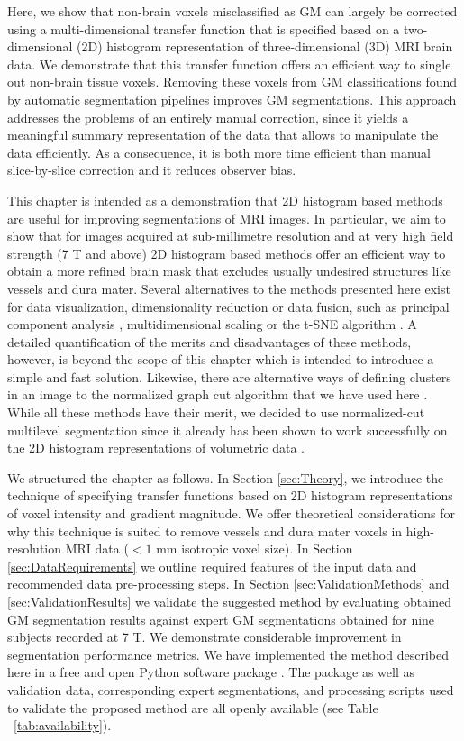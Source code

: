 Here, we show that non-brain voxels misclassified as GM can largely be corrected using a multi-dimensional transfer function that is specified based on a two-dimensional (2D) histogram representation \parencite{Kindlmann1998, Kniss2001, Kniss2005, Ip2012} of three-dimensional (3D) MRI brain data. We demonstrate that this transfer function offers an efficient way to single out non-brain tissue voxels. Removing these voxels from GM classifications found by automatic segmentation pipelines improves GM segmentations. This approach addresses the problems of an entirely manual correction, since it yields a meaningful summary representation of the data that allows to manipulate the data efficiently. As a consequence, it is both more time efficient than manual slice-by-slice correction and it reduces observer bias.

This chapter is intended as a demonstration that 2D histogram based methods are useful for improving segmentations of MRI images. In particular, we aim to show that for images acquired at sub-millimetre resolution and at very high field strength (7 T and above) 2D histogram based methods offer an efficient way to obtain a more refined brain mask that excludes usually undesired structures like vessels and dura mater. Several alternatives to the methods presented here exist for data visualization, dimensionality reduction or data fusion, such as principal component analysis \parencite{PCA2002}, multidimensional scaling \parencite{MDS2005} or the t-SNE algorithm \parencite{VanDerMaaten2008}. A detailed quantification of the merits and disadvantages of these methods, however, is beyond the scope of this chapter which is intended to introduce a simple and fast solution. Likewise, there are alternative ways of defining clusters in an image to the normalized graph cut algorithm that we have used here \parencite{Venkataraju2009, Jain2011, Liu2012, NunezIglesias2013}. While all these methods have their merit, we decided to use normalized-cut multilevel segmentation since it already has been shown to work successfully on the 2D histogram representations of volumetric data \parencite{Ip2012}.

We structured the chapter as follows. In Section \ref{sec:Theory}, we introduce the technique of specifying transfer functions based on 2D histogram representations of voxel intensity and gradient magnitude. We offer theoretical considerations for why this technique is suited to remove vessels and dura mater voxels in high-resolution MRI data ($< 1$ mm isotropic voxel size). In Section \ref{sec:DataRequirements} we outline required features of the input data and recommended data pre-processing steps. In Section \ref{sec:ValidationMethods} and \ref{sec:ValidationResults} we validate the suggested method by evaluating obtained GM segmentation results against expert GM segmentations obtained for nine subjects recorded at 7 T. We demonstrate considerable improvement in segmentation performance metrics. We have implemented the method described here in a free and open Python software package \parencite{segmentator_v1.5.0}. The package as well as validation data, corresponding expert segmentations, and processing scripts used to validate the proposed method are all openly available (see Table ~\ref{tab:availability}).

